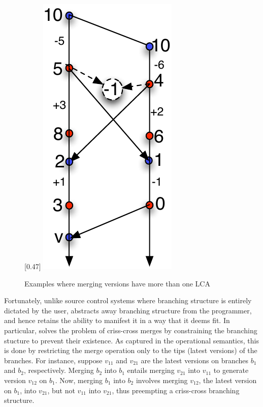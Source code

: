 \begin{figure}[!t]
\centering
{} [0.47\columnwidth] {
  \includegraphics[scale=0.55]{Figures/2-LCAs}
}
\caption{Examples where merging versions have more than one LCA}
\label{fig:many-lcas}
\end{figure}

Fortunately, unlike source control systems where branching structure
is entirely dictated by the user, \name abstracts away branching
structure from the programmer, and hence retains the ability to
manifest it in a way that it deems fit. In particular, \name solves
the problem of criss-cross merges by constraining the branching
stucture to prevent their existence. As captured in the operational
semantics, this is done by restricting the merge operation only to the
tips (latest versions) of the branches. For instance, suppose $v_{11}$
and $v_{21}$ are the latest versions on branches $b_1$ and $b_2$,
respectively. Merging $b_2$ into $b_1$ entails merging $v_{21}$ into
$v_{11}$ to generate version $v_{12}$ on $b_1$.  Now, merging $b_1$
into $b_2$ involves merging $v_{12}$, the latest version on $b_1$,
into $v_{21}$, but not $v_{11}$ into $v_{21}$, thus preempting a
criss-cross branching structure.

